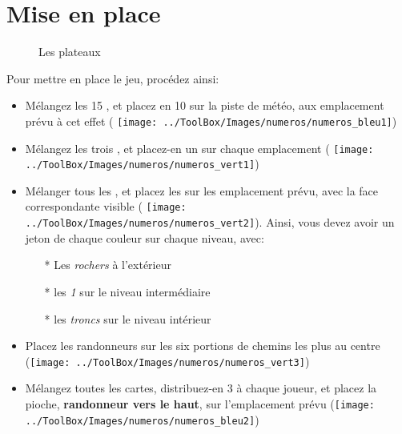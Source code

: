 \section*{Mise en place}
\begin{figure}%
    \qquad
    \caption{Les plateaux}%
    \label{fig:plateaux}%
\end{figure}
\FloatBarrier
    
Pour mettre en place le jeu, procédez ainsi:
\begin{itemize}
\item Mélangez les 15 \jetonsMeteo, et placez en 10 sur la piste de météo, aux emplacement prévu à cet effet ( \texttt{[image: ../ToolBox/Images/numeros/numeros\_bleu1]})
\item Mélangez les trois \marqueursObstacles, et placez-en un sur chaque emplacement ( \texttt{[image: ../ToolBox/Images/numeros/numeros\_vert1]})
\item Mélanger tous les \jetonsObstacles, et placez les sur les emplacement prévu, avec la face correspondante visible ( \texttt{[image: ../ToolBox/Images/numeros/numeros\_vert2]}). Ainsi, vous devez avoir un jeton de chaque couleur sur chaque niveau, avec:
\begin{itemize}
\item[*] Les \textit{rochers} à l'extérieur
\item[*] les \textit{1} sur le niveau intermédiaire
\item[*] les \textit{troncs} sur le niveau intérieur
\end{itemize}
\item Placez les randonneurs sur les six portions de chemins les plus au centre (\texttt{[image: ../ToolBox/Images/numeros/numeros\_vert3]})
\item Mélangez toutes les cartes, distribuez-en 3 à chaque joueur, et placez la pioche, \textbf{randonneur vers le haut}, sur l'emplacement prévu (\texttt{[image: ../ToolBox/Images/numeros/numeros\_bleu2]})
\end{itemize}
\FloatBarrier

